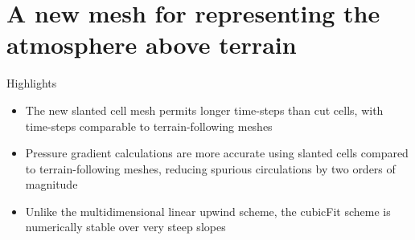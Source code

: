 \chapter{A new mesh for representing the atmosphere above terrain}
\label{ch:slanted}

\begin{highlights}
{\Large Highlights}
\begin{itemize}
	\item The new slanted cell mesh permits longer time-steps than cut cells, with time-steps comparable to terrain-following meshes
	\item Pressure gradient calculations are more accurate using slanted cells compared to terrain-following meshes, reducing spurious circulations by two orders of magnitude
	\item Unlike the multidimensional linear upwind scheme, the cubicFit scheme is numerically stable over very steep slopes
\end{itemize}
\end{highlights}






